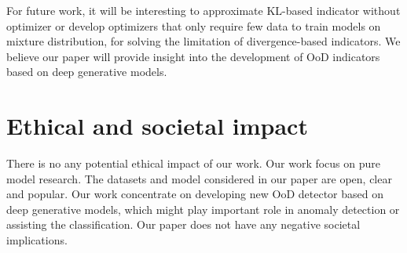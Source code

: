 \documentclass[letterpaper]{article} %
\begin{document}
For future work, it will be interesting to approximate KL-based indicator without optimizer or develop optimizers that only require few data to train models on mixture distribution, for solving the limitation of divergence-based indicators.  We believe our paper will provide insight into the development of OoD indicators based on deep generative models. 

\newpage
\section{Ethical and societal impact}
There is no any potential ethical impact of our work. Our work focus on pure model research. The datasets and model considered in our paper are open, clear and popular. Our work concentrate on developing new OoD detector based on deep generative models, which might play important role in anomaly detection or assisting the classification. Our paper does not have any negative societal implications.  

\end{document}
